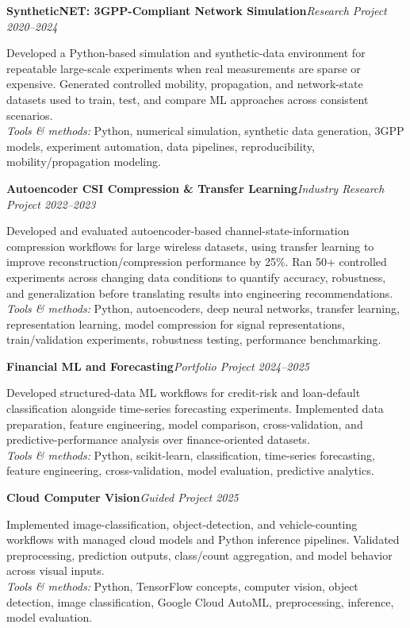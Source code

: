 \documentclass[10pt,letterpaper]{extarticle}
\newcommand{\project}[3]{\Needspace{3\baselineskip}\textbf{#1}\hfill\textit{#2 \textbar{} #3}\par}
\begin{document}
\project{SyntheticNET: 3GPP-Compliant Network Simulation}{Research Project}{2020--2024}
Developed a Python-based simulation and synthetic-data environment for repeatable large-scale experiments when real measurements are sparse or expensive. Generated controlled mobility, propagation, and network-state datasets used to train, test, and compare ML approaches across consistent scenarios.\\[-1pt]
{\small\textit{Tools \& methods:} Python, numerical simulation, synthetic data generation, 3GPP models, experiment automation, data pipelines, reproducibility, mobility/propagation modeling.}

\project{Autoencoder CSI Compression \& Transfer Learning}{Industry Research Project}{2022--2023}
Developed and evaluated autoencoder-based channel-state-information compression workflows for large wireless datasets, using transfer learning to improve reconstruction/compression performance by 25\%. Ran 50+ controlled experiments across changing data conditions to quantify accuracy, robustness, and generalization before translating results into engineering recommendations.\\[-1pt]
{\small\textit{Tools \& methods:} Python, autoencoders, deep neural networks, transfer learning, representation learning, model compression for signal representations, train/validation experiments, robustness testing, performance benchmarking.}

\project{Financial ML and Forecasting}{Portfolio Project}{2024--2025}
Developed structured-data ML workflows for credit-risk and loan-default classification alongside time-series forecasting experiments. Implemented data preparation, feature engineering, model comparison, cross-validation, and predictive-performance analysis over finance-oriented datasets.\\[-1pt]
{\small\textit{Tools \& methods:} Python, scikit-learn, classification, time-series forecasting, feature engineering, cross-validation, model evaluation, predictive analytics.}

\project{Cloud Computer Vision}{Guided Project}{2025}
Implemented image-classification, object-detection, and vehicle-counting workflows with managed cloud models and Python inference pipelines. Validated preprocessing, prediction outputs, class/count aggregation, and model behavior across visual inputs.\\[-1pt]
{\small\textit{Tools \& methods:} Python, TensorFlow concepts, computer vision, object detection, image classification, Google Cloud AutoML, preprocessing, inference, model evaluation.}
\end{document}
